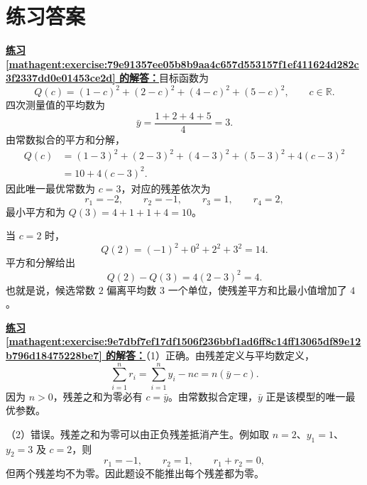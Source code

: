\documentclass[UTF8,fontset=fandol,11pt]{ctexart}
\begin{document}
\section*{练习答案}
\par\noindent\textbf{\hyperref[mathagent:exercise:79e91357ee05b8b9aa4c657d553157f1ef411624d282c3f2337dd0e01453ce2d]{练习 \ref*{mathagent:exercise:79e91357ee05b8b9aa4c657d553157f1ef411624d282c3f2337dd0e01453ce2d} 的解答：}}目标函数为
\[
Q(c)=(1-c)^2+(2-c)^2+(4-c)^2+(5-c)^2,\qquad c\in\mathbb{R}.
\]
四次测量值的平均数为
\[
\bar{y}=\frac{1+2+4+5}{4}=3.
\]
由常数拟合的平方和分解，
\[
\begin{aligned}
Q(c)&=(1-3)^2+(2-3)^2+(4-3)^2+(5-3)^2+4(c-3)^2\\
&=10+4(c-3)^2.
\end{aligned}
\]
因此唯一最优常数为 $c=3$，对应的残差依次为
\[
r_1=-2,\qquad r_2=-1,\qquad r_3=1,\qquad r_4=2,
\]
最小平方和为 $Q(3)=4+1+1+4=10$。

当 $c=2$ 时，
\[
Q(2)=(-1)^2+0^2+2^2+3^2=14.
\]
平方和分解给出
\[
Q(2)-Q(3)=4(2-3)^2=4.
\]
也就是说，候选常数 $2$ 偏离平均数 $3$ 一个单位，使残差平方和比最小值增加了 $4$。\par
\par\noindent\textbf{\hyperref[mathagent:exercise:9e7dbf7ef17df1506f236bbf1ad6ff8c14ff13065df89e12b796d18475228be7]{练习 \ref*{mathagent:exercise:9e7dbf7ef17df1506f236bbf1ad6ff8c14ff13065df89e12b796d18475228be7} 的解答：}}（1）正确。由残差定义与平均数定义，
\[
\sum_{i=1}^{n}r_i=\sum_{i=1}^{n}y_i-nc=n(\bar{y}-c).
\]
因为 $n>0$，残差之和为零必有 $c=\bar{y}$。由常数拟合定理，$\bar{y}$ 正是该模型的唯一最优参数。

（2）错误。残差之和为零可以由正负残差抵消产生。例如取 $n=2$、$y_1=1$、$y_2=3$ 及 $c=2$，则
\[
r_1=-1,\qquad r_2=1,\qquad r_1+r_2=0,
\]
但两个残差均不为零。因此题设不能推出每个残差都为零。
\end{document}
